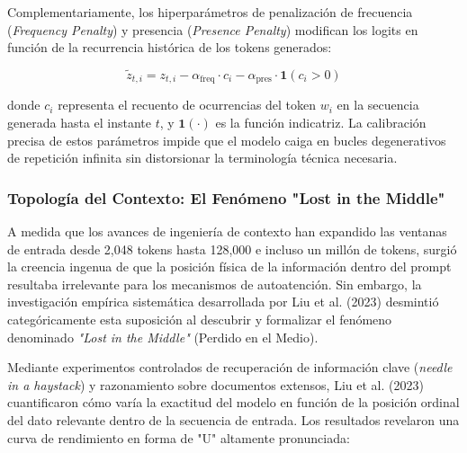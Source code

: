 Complementariamente, los hiperparámetros de penalización de frecuencia (\textit{Frequency Penalty}) y presencia (\textit{Presence Penalty}) modifican los logits en función de la recurrencia histórica de los tokens generados:

\begin{equation}
\tilde{z}_{t, i} = z_{t, i} - \alpha_{\mathrm{freq}} \cdot c_i - \alpha_{\mathrm{pres}} \cdot \mathbf{1}(c_i > 0)
\end{equation}

donde $c_i$ representa el recuento de ocurrencias del token $w_i$ en la secuencia generada hasta el instante $t$, y $\mathbf{1}(\cdot)$ es la función indicatriz. La calibración precisa de estos parámetros impide que el modelo caiga en bucles degenerativos de repetición infinita sin distorsionar la terminología técnica necesaria.

\subsubsection{Topología del Contexto: El Fenómeno "Lost in the Middle"}

A medida que los avances de ingeniería de contexto han expandido las ventanas de entrada desde 2,048 tokens hasta 128,000 e incluso un millón de tokens, surgió la creencia ingenua de que la posición física de la información dentro del prompt resultaba irrelevante para los mecanismos de autoatención. Sin embargo, la investigación empírica sistemática desarrollada por Liu et al. (2023) desmintió categóricamente esta suposición al descubrir y formalizar el fenómeno denominado \textit{"Lost in the Middle"} (Perdido en el Medio).

Mediante experimentos controlados de recuperación de información clave (\textit{needle in a haystack}) y razonamiento sobre documentos extensos, Liu et al. (2023) cuantificaron cómo varía la exactitud del modelo en función de la posición ordinal del dato relevante dentro de la secuencia de entrada. Los resultados revelaron una curva de rendimiento en forma de "U" altamente pronunciada:

